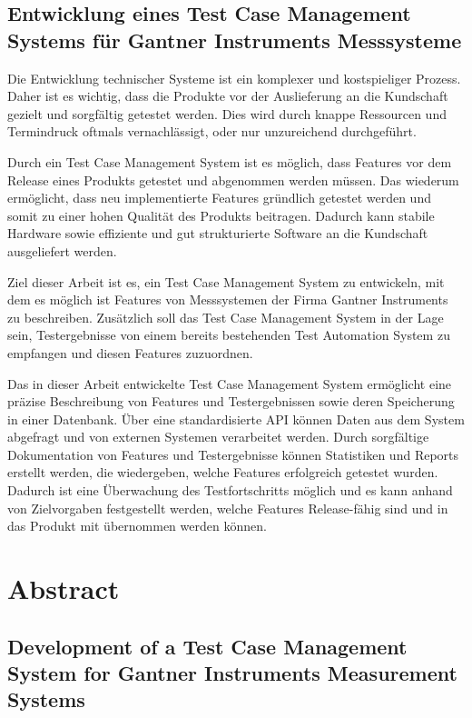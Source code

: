 \documentclass[a4paper, fontsize=11pt, parskip=half, twoside, headings=openright]{scrreprt}
\begin{document}
	\subsection*{Entwicklung eines Test Case Management Systems für Gantner Instruments Messsysteme}
	
	Die Entwicklung technischer Systeme ist ein komplexer und kostspieliger Prozess. 
	Daher ist es wichtig, dass die Produkte vor der Auslieferung an die Kundschaft gezielt und sorgfältig getestet werden. 
	Dies wird durch knappe Ressourcen und Termindruck oftmals vernachlässigt, oder nur unzureichend durchgeführt. 
	
	Durch ein Test Case Management System ist es möglich, dass Features vor dem Release eines Produkts getestet und abgenommen werden müssen. 
	Das wiederum ermöglicht, dass neu implementierte Features gründlich getestet werden und somit zu einer hohen Qualität des Produkts beitragen.
	Dadurch kann stabile Hardware sowie effiziente und gut strukturierte Software an die Kundschaft ausgeliefert werden.
	
	Ziel dieser Arbeit ist es, ein Test Case Management System zu entwickeln, mit dem es möglich ist Features von Messsystemen der Firma Gantner Instruments zu beschreiben.
	Zusätzlich soll das Test Case Management System in der Lage sein, Testergebnisse von einem bereits bestehenden Test Automation System zu empfangen und diesen Features zuzuordnen.
	
	Das in dieser Arbeit entwickelte Test Case Management System ermöglicht eine präzise Beschreibung von Features und Testergebnissen sowie deren Speicherung in einer Datenbank. 
	Über eine standardisierte API können Daten aus dem System abgefragt und von externen Systemen verarbeitet werden. 
	Durch sorgfältige Dokumentation von Features und Testergebnisse können Statistiken und Reports erstellt werden, die wiedergeben, welche Features erfolgreich getestet wurden.
	Dadurch ist eine Überwachung des Testfortschritts möglich und es kann anhand von Zielvorgaben festgestellt werden, welche Features Release-fähig sind und in das Produkt mit übernommen werden können.
	
	\cleardoublepage
	\section*{Abstract}
	\subsection*{Development of a Test Case Management System for Gantner Instruments Measurement Systems}
	
\end{document}
